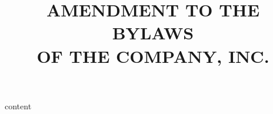 \documentclass[12pt]{scrartcl}
\title{AMENDMENT TO THE BYLAWS\\OF THE COMPANY, INC.}
\begin{document}
\maketitle
{content}
\end{document}
